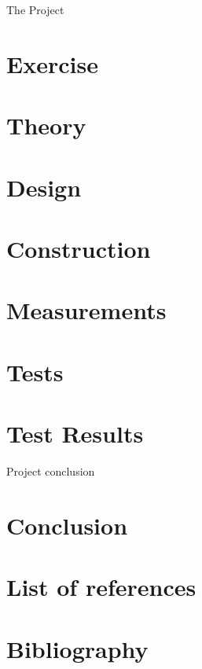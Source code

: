\documentclass{report}
\begin{document}
\begin{chapter}{The Project}
\lipsum[3-6]
\clearpage

\section{Exercise}
\lipsum[2-8]
\clearpage

\section{Theory}
\lipsum[3-12]
\clearpage

\section{Design}
\lipsum[1-5]
\clearpage

\section{Construction}
\lipsum[3-4]
\clearpage

\section{Measurements}
\lipsum[3-5]
\clearpage

\section{Tests}
\lipsum[1-9]
\clearpage

\section{Test Results}
\lipsum[5-10]
\clearpage
\end{chapter}

\begin{chapter}{Project conclusion}
\section{Conclusion}
\lipsum[3-5]
\clearpage

\section{List of references}
\lipsum[3-5]
\clearpage

\section{Bibliography}
\lipsum[3-5]
\clearpage
\end{chapter}
\end{document}
